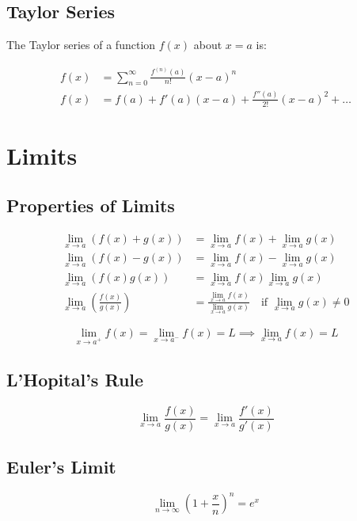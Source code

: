 \documentclass[12pt]{article}
\begin{document}
\subsection*{Taylor Series}

The Taylor series of a function $f(x)$ about $x=a$ is:

\begin{align}
  f(x) &= \sum_{n=0}^{\infty} \frac{f^{(n)}(a)}{n!} (x-a)^n \\[0.5em]
  f(x) &= f(a) + f'(a)(x-a) + \frac{f''(a)}{2!}(x-a)^2 + \ldots
\end{align}



\section{Limits}

\subsection*{Properties of Limits}

\begin{align}
  \lim_{x \to a} (f(x) + g(x)) &= \lim_{x \to a} f(x) + \lim_{x \to a} g(x) \\
  \lim_{x \to a} (f(x) - g(x)) &= \lim_{x \to a} f(x) - \lim_{x \to a} g(x) \\
  \lim_{x \to a} (f(x) g(x)) &= \lim_{x \to a} f(x) \lim_{x \to a} g(x) \\
  \lim_{x \to a} \left( \frac{f(x)}{g(x)} \right) &= \frac{\lim_{x \to a} f(x)}{\lim_{x \to a} g(x)} \quad \text{if } \lim_{x \to a} g(x) \neq 0
\end{align}


\begin{equation}
  \lim_{x \to a^{+}} f(x) = \lim_{x \to a^{-}} f(x) = L \implies \lim_{x \to a} f(x) = L
\end{equation}


\vspace{1cm}
\noindent
\begin{minipage}[t]{0.45\textwidth}
\subsection*{L'Hopital's Rule}
\begin{equation}
  \lim_{x \to a} \frac{f(x)}{g(x)} = \lim_{x \to a} \frac{f'(x)}{g'(x)}
\end{equation}
\end{minipage}%
\hfill
\begin{minipage}[t]{0.45\textwidth}
  \subsection*{Euler's Limit}
\begin{equation}
  \lim_{n \to \infty} \left( 1 + \frac{x}{n} \right)^n = e^x
\end{equation}
\end{minipage}
\end{document}
